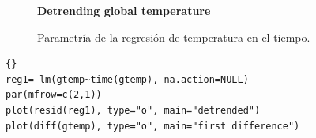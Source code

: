 \begin{figure}[H]
	\centering
	\textbf{Detrending global temperature}\par\medskip
	\caption{Parametría de la regresión de temperatura en el tiempo.}\label{fig2}
\end{figure}


\begin{lstlisting}[title={‘Código R: ejemplo 1 Regresando gtemp sobre tiempo.’},basicstyle=\ttfamily]{}
reg1= lm(gtemp~time(gtemp), na.action=NULL) 
par(mfrow=c(2,1))
plot(resid(reg1), type="o", main="detrended")
plot(diff(gtemp), type="o", main="first difference")
\end{lstlisting}

